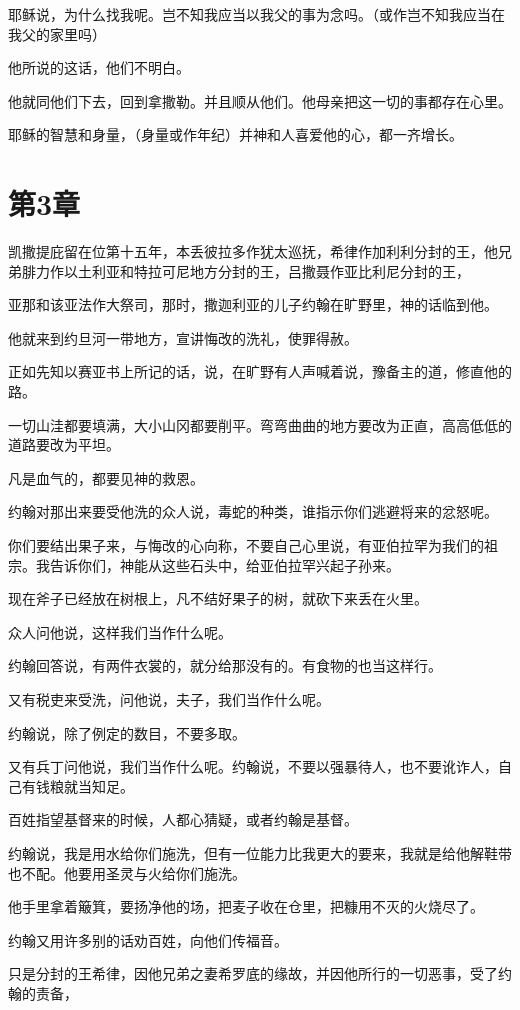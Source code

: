 \documentclass[12pt,oneside]{book}
\begin{document}
耶稣说，为什么找我呢。岂不知我应当以我父的事为念吗。（或作岂不知我应当在我父的家里吗）

他所说的这话，他们不明白。

他就同他们下去，回到拿撒勒。并且顺从他们。他母亲把这一切的事都存在心里。

耶稣的智慧和身量，（身量或作年纪）并神和人喜爱他的心，都一齐增长。

\chapter{第3章}
凯撒提庇留在位第十五年，本丢彼拉多作犹太巡抚，希律作加利利分封的王，他兄弟腓力作以土利亚和特拉可尼地方分封的王，吕撒聂作亚比利尼分封的王，

亚那和该亚法作大祭司，那时，撒迦利亚的儿子约翰在旷野里，神的话临到他。

他就来到约旦河一带地方，宣讲悔改的洗礼，使罪得赦。

正如先知以赛亚书上所记的话，说，在旷野有人声喊着说，豫备主的道，修直他的路。

一切山洼都要填满，大小山冈都要削平。弯弯曲曲的地方要改为正直，高高低低的道路要改为平坦。

凡是血气的，都要见神的救恩。

约翰对那出来要受他洗的众人说，毒蛇的种类，谁指示你们逃避将来的忿怒呢。

你们要结出果子来，与悔改的心向称，不要自己心里说，有亚伯拉罕为我们的祖宗。我告诉你们，神能从这些石头中，给亚伯拉罕兴起子孙来。

现在斧子已经放在树根上，凡不结好果子的树，就砍下来丢在火里。

众人问他说，这样我们当作什么呢。

约翰回答说，有两件衣裳的，就分给那没有的。有食物的也当这样行。

又有税吏来受洗，问他说，夫子，我们当作什么呢。

约翰说，除了例定的数目，不要多取。

又有兵丁问他说，我们当作什么呢。约翰说，不要以强暴待人，也不要讹诈人，自己有钱粮就当知足。

百姓指望基督来的时候，人都心猜疑，或者约翰是基督。

约翰说，我是用水给你们施洗，但有一位能力比我更大的要来，我就是给他解鞋带也不配。他要用圣灵与火给你们施洗。

他手里拿着簸箕，要扬净他的场，把麦子收在仓里，把糠用不灭的火烧尽了。

约翰又用许多别的话劝百姓，向他们传福音。

只是分封的王希律，因他兄弟之妻希罗底的缘故，并因他所行的一切恶事，受了约翰的责备，
\end{document}
